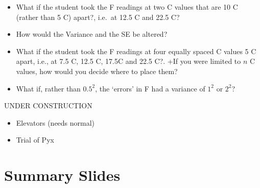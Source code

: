 \documentclass[]{book}
\providecommand{\tightlist}{%
  \setlength{\itemsep}{0pt}\setlength{\parskip}{0pt}}
\begin{document}
\begin{itemize}
\tightlist
\item
  What if the student took the F readings at two C values that are 10 C (rather than 5 C) apart?, i.e.~at 12.5 C and 22.5 C?
\item
  How would the Variance and the SE be altered?
\item
  What if the student took the F readings at four equally spaced C values 5 C apart, i.e., at 7.5 C, 12.5 C, 17.5C and 22.5 C?.
  +If you were limited to \(n\) C values, how would you decide where to place them?
\item
  What if, rather than \(0.5^2\), the `errors' in F had a variance of \(1^2\) or \(2^2\)?
\end{itemize}

UNDER CONSTRUCTION

\begin{itemize}
\item
  Elevators (needs normal)
\item
  Trial of Pyx
\end{itemize}

\hypertarget{summary-slides-1}{%
\section{Summary Slides}\label{summary-slides-1}}
\end{document}
